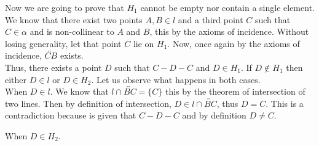 \documentclass[11pt]{article}
\begin{document}
        Now we are going to prove that $H_1$ cannot be empty nor contain a single element. We know that there exist two points $A, B \in l$ and a third point $C$ such that $C \in \alpha$ and is non-collinear to $A$ and $B$, this by the axioms of incidence. Without losing generality, let that point $C$ lie on $H_1$. Now, once again by the axioms of incidence, $\overleftrightarrow{CB}$ exists.\\
        Thus, there exists a point $D$ such that $ C - D - C$ and $D \in H_1$. If $D \not \in H_1$ then either $D \in l$ or $D \in H_2$. Let us observe what happens in both cases.\\

        When $D \in l$. We know that $l \cap \overleftrightarrow{BC} = \{C\}$ this by the theorem of intersection of two lines. Then by definition of intersection, $D \in l \cap \overleftrightarrow{BC}$, thus $D = C$. This is a contradiction because is given that $C - D -C$ and by definition $D \not = C$.

        When $D \in H_2$.
\end{document}
